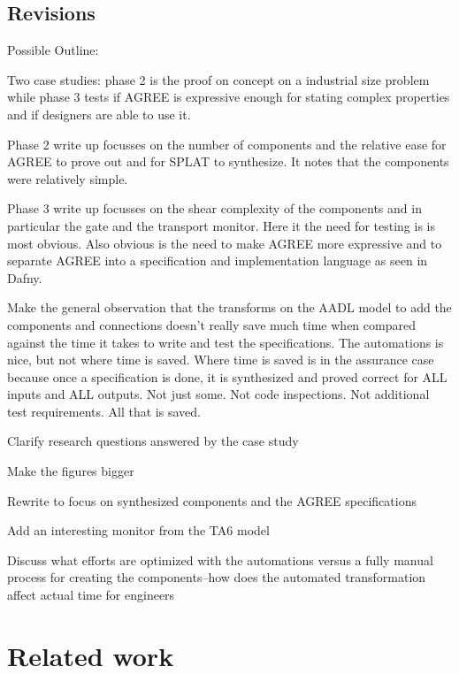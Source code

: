\documentclass[global,twocolumn]{svjour}
\begin{document}
\subsection{Revisions}
\begin{compactitem}
  \item Possible Outline:
  \begin{compactitem}
    \item Two case studies: phase 2 is the proof on concept on a industrial size problem while phase 3 tests if AGREE is expressive enough for stating complex properties and if designers are able to use it.
    \item Phase 2 write up focusses on the number of components and the relative ease for AGREE to prove out and for SPLAT to synthesize. It notes that the components were relatively simple.
    \item Phase 3 write up focusses on the shear complexity of the components and in particular the gate and the transport monitor. Here it the need for testing is is most obvious. Also obvious is the need to make AGREE more expressive and to separate AGREE into a specification and implementation language as seen in Dafny.
    \item Make the general observation that the transforms on the AADL model to add the components and connections doesn't really save much time when compared against the time it takes to write and test the specifications. The automations is nice, but not where time is saved. Where time is saved is in the assurance case because once a specification is done, it is synthesized and proved correct for ALL inputs and ALL outputs. Not just some. Not code inspections. Not additional test requirements. All that is saved.
  \end{compactitem}
  \item Clarify research questions answered by the case study
  \item Make the figures bigger
  \item Rewrite to focus on synthesized components and the AGREE specifications
  \item Add an interesting monitor from the TA6 model
  \item Discuss what efforts are optimized with the automations versus a fully manual process for creating the components--how does the automated transformation affect actual time for engineers
\end{compactitem}
\fi

\section{Related work}
\label{sec:related-work}

\end{document}
